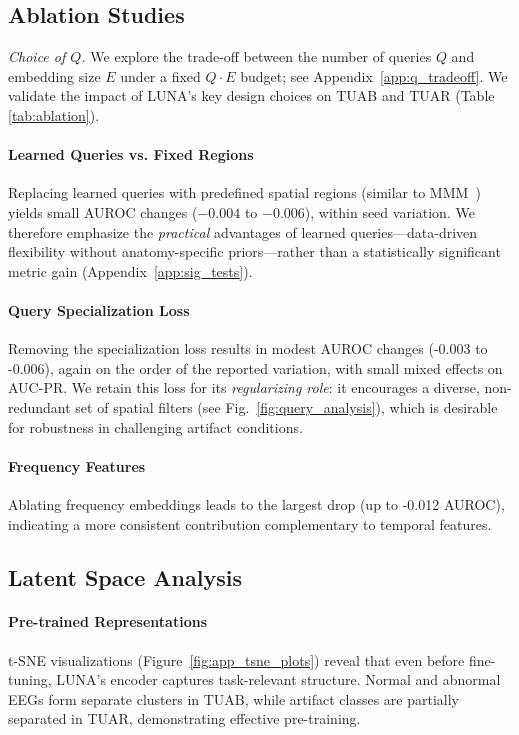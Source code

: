 \subsection{Ablation Studies}
\label{subsec:ablations}
\emph{Choice of $Q$.} We explore the trade-off between the number of queries $Q$ and embedding size $E$ under a fixed $Q\!\cdot\!E$ budget; see Appendix~\ref{app:q_tradeoff}. We validate the impact of LUNA's key design choices on TUAB and TUAR (Table \ref{tab:ablation}).

\vspace{-4mm}
\paragraph{Learned Queries vs. Fixed Regions}
Replacing learned queries with predefined spatial regions (similar to MMM~\citep{yi2023learning}) yields small AUROC changes ($-0.004$ to $-0.006$), within seed variation. We therefore emphasize the \emph{practical} advantages of learned queries—data-driven flexibility without anatomy-specific priors—rather than a statistically significant metric gain (Appendix~\ref{app:sig_tests}).

\vspace{-4mm}
\paragraph{Query Specialization Loss}
Removing the specialization loss results in modest AUROC changes (-0.003 to -0.006), again on the order of the reported variation, with small mixed effects on AUC-PR. We retain this loss for its \emph{regularizing role}: it encourages a diverse, non-redundant set of spatial filters (see Fig.~\ref{fig:query_analysis}), which is desirable for robustness in challenging artifact conditions.

\vspace{-4mm}
\paragraph{Frequency Features}
Ablating frequency embeddings leads to the largest drop (up to -0.012 AUROC), indicating a more consistent contribution complementary to temporal features.


\subsection{Latent Space Analysis}
\paragraph{Pre-trained Representations}
t-SNE visualizations (Figure~\ref{fig:app_tsne_plots}) reveal that even before fine-tuning, LUNA's encoder captures task-relevant structure. Normal and abnormal EEGs form separate clusters in TUAB, while artifact classes are partially separated in TUAR, demonstrating effective pre-training.


